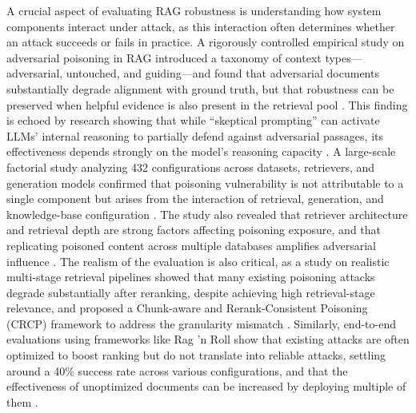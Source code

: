\documentclass[11pt]{article}
\begin{document}
A crucial aspect of evaluating RAG robustness is understanding how system components interact under attack, as this interaction often determines whether an attack succeeds or fails in practice. A rigorously controlled empirical study on adversarial poisoning in RAG introduced a taxonomy of context types---adversarial, untouched, and guiding---and found that adversarial documents substantially degrade alignment with ground truth, but that robustness can be preserved when helpful evidence is also present in the retrieval pool \cite{ref213}. This finding is echoed by research showing that while ``skeptical prompting'' can activate LLMs' internal reasoning to partially defend against adversarial passages, its effectiveness depends strongly on the model's reasoning capacity \cite{ref213}. A large-scale factorial study analyzing 432 configurations across datasets, retrievers, and generation models confirmed that poisoning vulnerability is not attributable to a single component but arises from the interaction of retrieval, generation, and knowledge-base configuration \cite{ref219}. The study also revealed that retriever architecture and retrieval depth are strong factors affecting poisoning exposure, and that replicating poisoned content across multiple databases amplifies adversarial influence \cite{ref219}. The realism of the evaluation is also critical, as a study on realistic multi-stage retrieval pipelines showed that many existing poisoning attacks degrade substantially after reranking, despite achieving high retrieval-stage relevance, and proposed a Chunk-aware and Rerank-Consistent Poisoning (CRCP) framework to address the granularity mismatch \cite{ref437}. Similarly, end-to-end evaluations using frameworks like Rag 'n Roll show that existing attacks are often optimized to boost ranking but do not translate into reliable attacks, settling around a 40\% success rate across various configurations, and that the effectiveness of unoptimized documents can be increased by deploying multiple of them \cite{ref70}.
\end{document}
